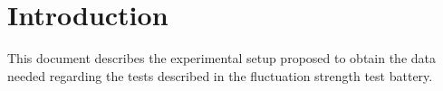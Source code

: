 \documentclass[a4paper]{article}
\begin{document}

\section{Introduction}

This document describes the experimental setup proposed to obtain the data
needed regarding the tests described in the fluctuation strength test battery.
\end{document}
